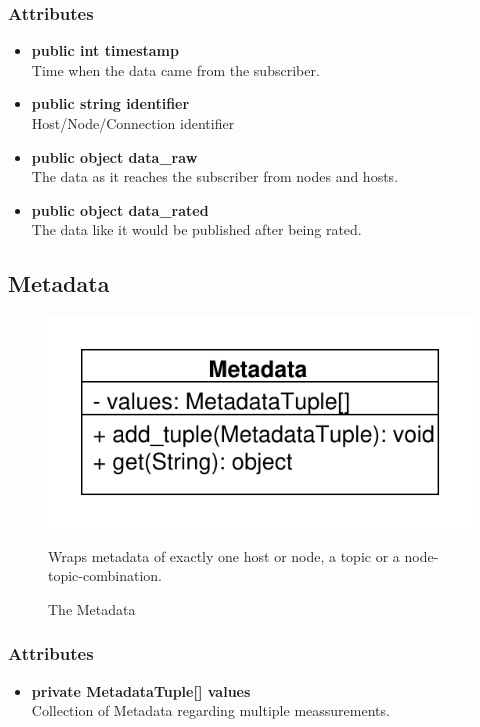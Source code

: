 \subsubsection{Attributes}
\begin{itemize}
	\item \textbf{public int timestamp}\\
	Time when the data came from the subscriber.
	\item \textbf{public string identifier}\\
	Host/Node/Connection identifier
	\item \textbf{public object data\_raw}\\
	The data as it reaches the subscriber from nodes and hosts.
	\item \textbf{public object data\_rated}\\
	The data like it would be published after being rated.
\end{itemize}


\subsection{Metadata}
\begin{figure}[htbp]
	\begin{minipage}[t]{7cm}
		\vspace{0pt}
		\centering
		\includegraphics[scale=0.6]{./diagram_pictures/Metadata.pdf}
		\caption{The Metadata}
	\end{minipage}
	\hfill
	\begin{minipage}[t]{8cm}
		\vspace{10pt}
		Wraps metadata of exactly one host or node, a topic or a node-topic-combination.
	\end{minipage}
\end{figure}

\subsubsection{Attributes}
\begin{itemize}
	\item \textbf{private MetadataTuple[] values}\\
	Collection of Metadata regarding multiple meassurements.
\end{itemize}
